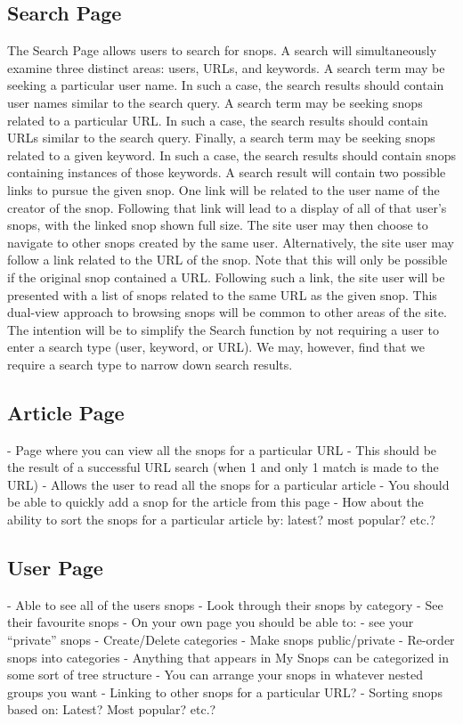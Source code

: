 \documentclass[11pt]{article}
\begin{document}
\subsection{Search Page}
\label{sec:searchpage}
The Search Page allows users to search for snops. A search will simultaneously examine three distinct areas: users, URLs, and keywords.
A search term may be seeking a particular user name. In such a case, the search results should contain user names similar to the search query.
A search term may be seeking snops related to a particular URL. In such a case, the search results should contain URLs similar to the search query. Finally, a search term may be seeking snops related to a given keyword. In such a case, the search results should contain snops containing instances of those keywords. A search result will contain two possible links to pursue the given snop. One link will be related to the user name of the creator of the snop. Following that link will lead to a display of all of that user's snops, with the linked snop shown full size. The site user may then choose to navigate to other snops created by the same user. Alternatively, the site user may follow a link related to the URL of the snop. Note that this will only be possible if the original snop contained a URL. Following such a link, the site user will be presented with a list of snops related to the same URL as the given snop. This dual-view approach to browsing snops will be common to other areas of the site.
The intention will be to simplify the Search function by not requiring a user to enter a search type (user, keyword, or URL). We may, however, find that we require a search type to narrow down search results.
\subsection{Article Page}
- Page where you can view all the snops for a particular URL
- This should be the result of a successful URL search (when 1 and only 1 match is made to the URL)
- Allows the user to read all the snops for a particular article
- You should be able to quickly add a snop for the article from this page
- How about the ability to sort the snops for a particular article by: latest? most popular? etc.?
\subsection{User Page}
- Able to see all of the users snops
- Look through their snops by category
- See their favourite snops
- On your own page you should be able to:
- see your “private” snops
- Create/Delete categories
- Make snops public/private
- Re-order snops into categories
- Anything that appears in My Snops can be categorized in some sort of tree structure
- You can arrange your snops in whatever nested groups you want
- Linking to other snops for a particular URL?
- Sorting snops based on: Latest? Most popular? etc.?
\end{document}
